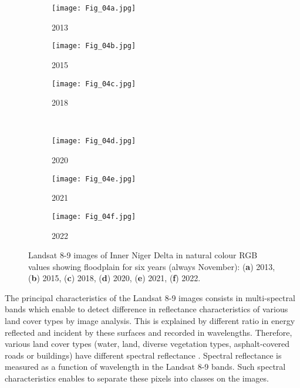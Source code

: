 \documentclass[12pt,a4paper,oneside]{article}
\def \newpar{\vspace{6pt}}
\begin{document}
\begin{figure}[H]
	\begin{subfigure}[b]{.35\textwidth}
		\centering
			\texttt{[image: Fig\_04a.jpg]}
		\caption{2013}
	\end{subfigure}%
	\begin{subfigure}[b]{.35\textwidth}
		\centering
		\texttt{[image: Fig\_04b.jpg]}
		\caption{2015}
	\end{subfigure}%
	\begin{subfigure}[b]{.35\textwidth}
		\centering
		\texttt{[image: Fig\_04c.jpg]}
		\caption{2018}
	\end{subfigure}%
\\
\vfill \vspace{1mm}
	\begin{subfigure}[b]{.35\textwidth}
		\centering
			\texttt{[image: Fig\_04d.jpg]}
		\caption{2020}
	\end{subfigure}%
	\begin{subfigure}[b]{.35\textwidth}
		\centering
		\texttt{[image: Fig\_04e.jpg]}
		\caption{2021}
	\end{subfigure}%
	\begin{subfigure}[b]{.35\textwidth}
		\centering
		\texttt{[image: Fig\_04f.jpg]}
		\caption{2022}
	\end{subfigure}%
\vspace*{20pt}\caption{Landsat 8-9 images of Inner Niger Delta in natural colour RGB values showing floodplain for six years (always November): (\textbf{a}) 2013, (\textbf{b}) 2015, (\textbf{c}) 2018, (\textbf{d}) 2020, (\textbf{e}) 2021, (\textbf{f}) 2022.}\label{fig04}
\end{figure}

\newpar The principal characteristics of the Landsat 8-9 images consists in multi-spectral bands which enable to detect difference in reflectance characteristics of various land cover types by image analysis. This is explained by different ratio in energy reflected and incident by these surfaces and recorded in wavelengths. Therefore, various land cover types (water, land, diverse vegetation types, asphalt-covered roads or buildings) have different spectral reflectance \citep{RichardsJia,ChapmanGasparovic}. Spectral reflectance is measured as a function of wavelength in the Landsat 8-9 bands. Such spectral characteristics enables to separate these pixels into classes on the images.
\end{document}
